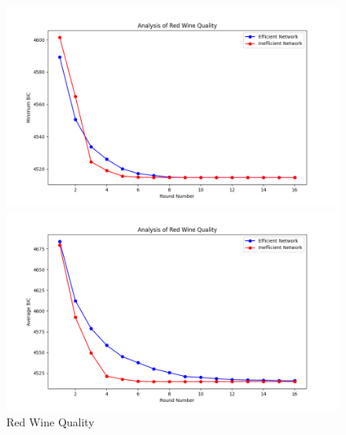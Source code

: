 \documentclass[conference]{IEEEtran}
\begin{document}
\begin{figure}[htbp]
\centerline{\includegraphics[scale=0.4]{figures/Red Wine Quality Min.png}}
\centerline{\includegraphics[scale=0.4]{figures/Red Wine Quality Avg.png}}
\caption{Red Wine Quality}
\label{fig}
\end{figure}
\end{document}
